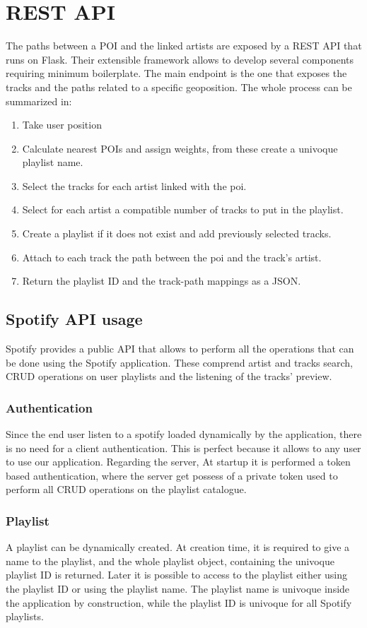 \section{REST API}
The paths between a POI and the linked artists are exposed by a REST API that runs on Flask. Their extensible framework allows to develop several components requiring minimum boilerplate.
The main endpoint is the one that exposes the tracks and the paths related to a specific geoposition.
The whole process can be summarized in:
\begin{enumerate}
\item Take user position
\item Calculate nearest POIs and assign weights, from these create a univoque playlist name.
\item Select the tracks for each artist linked with the poi.
\item Select for each artist a compatible number of tracks to put in the playlist.
\item Create a playlist if it does not exist and add previously selected tracks.
\item Attach to each track the path between the poi and the track's artist.
\item Return the playlist ID and the track-path mappings as a JSON.
\end{enumerate}
\subsection{Spotify API usage}
Spotify provides a public API that allows to perform all the operations that can be done using the Spotify application. These comprend artist and tracks search, CRUD operations on user playlists and the listening of the tracks' preview.
\subsubsection{Authentication}
Since the end user listen to a spotify loaded dynamically by the application, there is no need for a client authentication. This is perfect because it allows to any user to use our application. Regarding the server, At startup it is performed a token based authentication, where the server get possess of a private token used to perform all CRUD operations on the playlist catalogue.
\subsubsection{Playlist}
A playlist can be dynamically created. At creation time, it is required to give a name to the playlist, and the whole playlist object, containing the univoque playlist ID is returned. Later it is possible to access to the playlist either using the playlist ID or using the playlist name. The playlist name is univoque inside the application by construction, while the playlist ID is univoque for all Spotify playlists.
